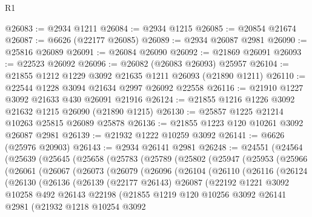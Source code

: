 \begin{lexlean}{R1}
\begin{coremodule}
@26083 := @2934 @1211
@26084 := @2934 @1215
@26085 := @20854 @21674
@26087 := @6626 (@22177 @26085)
@26089 := @2934 @26087 @2981
@26090 := @25816 @26089
@26091 := @26084 @26090
@26092 := @21869 @26091
@26093 := @22523 @26092
@26096 := @26082 (@26083 @26093) @25957
@26104 := @21855 @1212 @1229 @3092 @21635 @1211 @26093 (@21890 @1211)
@26110 := @22544 @1228 @3094 @21634 @2997 @26092 @22558
@26116 := @21910 @1227 @3092 @21633 @430 @26091 @21916
@26124 := @21855 @1216 @1226 @3092 @21632 @1215 @26090 (@21890 @1215)
@26130 := @25857 @1225 @21214 @10263 @25815 @26089 @25878
@26136 := @21855 @1223 @120 @10261 @3092 @26087 @2981
@26139 := @21932 @1222 @10259 @3092
@26141 := @6626 (@25976 @20903)
@26143 := @2934 @26141 @2981
@26248 := @24551
    (@24564
      (@25639
        (@25645
          (@25658
            (@25783
              (@25789
                (@25802
                  (@25947
                    (@25953
                      (@25966
                        (@26061
                          (@26067
                            (@26073
                              (@26079
                                (@26096
                                  (@26104
                                    (@26110
                                      (@26116
                                        (@26124
                                          (@26130
                                            (@26136
                                              (@26139
                                                (@22177 @26143)
                                                @26087
                                                (@22192
                                                  @1221
                                                  @3092
                                                  @10258
                                                  @492
                                                  @26143
                                                  @22198
                                                  (@21855
                                                    @1219
                                                    @120
                                                    @10256
                                                    @3092
                                                    @26141
                                                    @2981
                                                    (@21932
                                                      @1218
                                                      @10254
                                                      @3092

\end{coremodule}
\end{lexlean}
